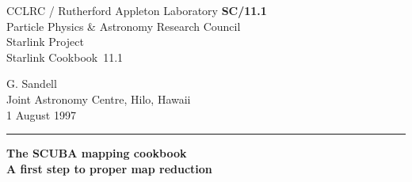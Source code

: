 \documentclass[twoside,11pt]{article}
\newcommand{\stardoccategory}  {Starlink Cookbook}
\newcommand{\stardocinitials}  {SC}
\newcommand{\stardocnumber}    {11.1}
\newcommand{\stardocauthors}   {G. Sandell \\ \jac}
\newcommand{\stardocdate}      {1 August 1997}
\newcommand{\stardoctitle}     {The SCUBA mapping cookbook\\[2ex]
                                A first step to proper map reduction}
\newcommand{\stardocversion}   {\ }
\newcommand{\stardocmanual}    {\ }
\newcommand{\jac}{\htmladdnormallink{Joint Astronomy Centre}{http://www.jach.hawaii.edu},
 Hilo, Hawaii}
\newcommand{\stardocname}{\stardocinitials /\stardocnumber}
\newcommand{\htmladdnormallink}[2]{#1}
\newenvironment{latexonly}{}{}
\begin{document}
\thispagestyle{empty}
 
\begin{latexonly}
   CCLRC / {\sc Rutherford Appleton Laboratory} \hfill {\bf \stardocname}\\
   {\large Particle Physics \& Astronomy Research Council}\\
   {\large Starlink Project\\}
   {\large \stardoccategory\ \stardocnumber}
   \begin{flushright}
   \stardocauthors\\
   \stardocdate
   \end{flushright}
   \vspace{-4mm}
   \rule{\textwidth}{0.5mm}
   \vspace{5mm}
   \begin{center}

   \vspace{5mm}
   {\Huge\bf  \stardoctitle \\ [2.5ex]}
   {\LARGE\bf \stardocversion \\ [4ex]}
   {\Huge\bf  \stardocmanual}
   \end{center}
   \vspace{5mm}
 
\end{latexonly}
 
\end{document}
